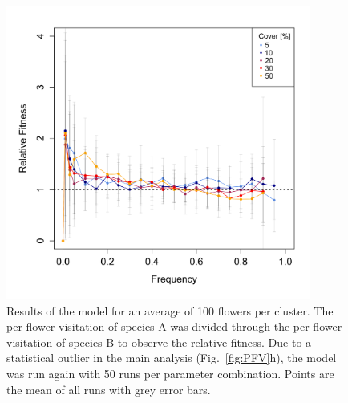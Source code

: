 \begin{figure} [!h]
	\centering
	\includegraphics[width=10cm]{Images/Outlier}
	\caption{Results of the model for an average of 100 flowers per cluster. The per-flower visitation of species A was divided through the per-flower visitation of species B to observe the relative fitness. Due to a statistical outlier in the main analysis (Fig.~\ref{fig:PFV}h), the model was run again with 50 runs per parameter combination. Points are the mean of all runs with grey error bars.}
	\label{fig:outlier}
\end{figure}



